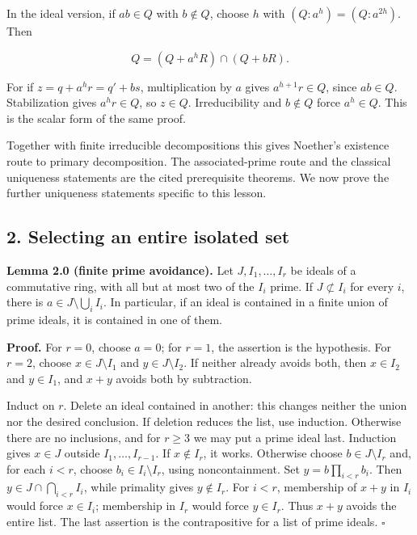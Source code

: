 \documentclass[
]{article}
\begin{document}
In the ideal version, if \(ab\in Q\) with \(b\notin Q\), choose \(h\)
with \((Q:a^h)=(Q:a^{2h})\). Then

\[
Q=(Q+a^hR)\cap(Q+bR).
\]

For if \(z=q+a^hr=q'+bs\), multiplication by \(a\) gives
\(a^{h+1}r\in Q\), since \(ab\in Q\). Stabilization gives \(a^hr\in Q\),
so \(z\in Q\). Irreducibility and \(b\notin Q\) force \(a^h\in Q\). This
is the scalar form of the same proof.

Together with finite irreducible decompositions this gives Noether's
existence route to primary decomposition. The associated-prime route and
the classical uniqueness statements are the cited prerequisite theorems.
We now prove the further uniqueness statements specific to this lesson.

\subsection{2. Selecting an entire isolated
set}\label{selecting-an-entire-isolated-set}

\textbf{Lemma 2.0 (finite prime avoidance).} Let \(J,I_1,\ldots,I_r\) be
ideals of a commutative ring, with all but at most two of the \(I_i\)
prime. If \(J\not\subset I_i\) for every \(i\), there is
\(a\in J\setminus\bigcup_i I_i\). In particular, if an ideal is
contained in a finite union of prime ideals, it is contained in one of
them.

\textbf{Proof.} For \(r=0\), choose \(a=0\); for \(r=1\), the assertion
is the hypothesis. For \(r=2\), choose \(x\in J\setminus I_1\) and
\(y\in J\setminus I_2\). If neither already avoids both, then
\(x\in I_2\) and \(y\in I_1\), and \(x+y\) avoids both by subtraction.

Induct on \(r\). Delete an ideal contained in another: this changes
neither the union nor the desired conclusion. If deletion reduces the
list, use induction. Otherwise there are no inclusions, and for
\(r\ge3\) we may put a prime ideal last. Induction gives \(x\in J\)
outside \(I_1,\ldots,I_{r-1}\). If \(x\notin I_r\), it works. Otherwise
choose \(b\in J\setminus I_r\) and, for each \(i<r\), choose
\(b_i\in I_i\setminus I_r\), using noncontainment. Set
\(y=b\prod_{i<r}b_i\). Then \(y\in J\cap\bigcap_{i<r}I_i\), while
primality gives \(y\notin I_r\). For \(i<r\), membership of \(x+y\) in
\(I_i\) would force \(x\in I_i\); membership in \(I_r\) would force
\(y\in I_r\). Thus \(x+y\) avoids the entire list. The last assertion is
the contrapositive for a list of prime ideals. \(\square\)
\end{document}
